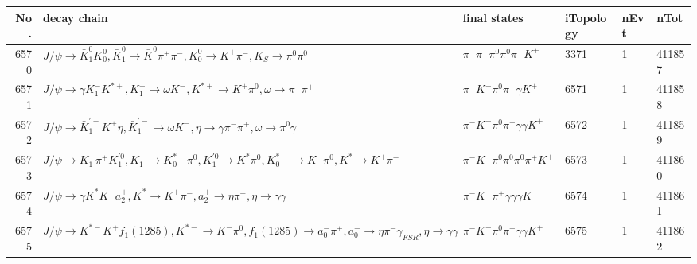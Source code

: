 \begin{table}[htbp] 
\begin{center}
\begin{small}
\begin{tabular}{rlllll}\hline\hline
 No. & decay chain & final states &  iTopology & nEvt & nTot \\\hline
6570&$J/\psi       \rightarrow \bar{K}_1^{0} K_0^{0}        , \bar{K}_1^{0}  \rightarrow \bar{K}^{0}   \pi^{+}        \pi^{-}        , K_0^{0}         \rightarrow K^{+}          \pi^{-}        , K_{S}           \rightarrow \pi^{0}        \pi^{0}        $&$\pi^{-}        \pi^{-}        \pi^{0}        \pi^{0}        \pi^{+}        K^{+}          $& 3371&    1&411857\\
6571&$J/\psi       \rightarrow \gamma       K_{1}^{-}      K^{*+}         , K_{1}^{-}       \rightarrow \omega         K^{-}          , K^{*+}          \rightarrow K^{+}          \pi^{0}        , \omega          \rightarrow \pi^{-}        \pi^{+}        $&$\pi^{-}        K^{-}          \pi^{0}        \pi^{+}        \gamma       K^{+}          $& 6571&    1&411858\\
6572&$J/\psi       \rightarrow \bar{K}_1^{'-}K^{+}          \eta          , \bar{K}_1^{'-} \rightarrow \omega         K^{-}          , \eta           \rightarrow \gamma       \pi^{-}        \pi^{+}        , \omega          \rightarrow \pi^{0}        \gamma       $&$\pi^{-}        K^{-}          \pi^{0}        \pi^{+}        \gamma       \gamma       K^{+}          $& 6572&    1&411859\\
6573&$J/\psi       \rightarrow K_{1}^{-}      \pi^{+}        K_1^{'0}      , K_{1}^{-}       \rightarrow K_{0}^{*-}     \pi^{0}        , K_1^{'0}       \rightarrow K^{*}          \pi^{0}        , K_{0}^{*-}      \rightarrow K^{-}          \pi^{0}        , K^{*}           \rightarrow K^{+}          \pi^{-}        $&$\pi^{-}        K^{-}          \pi^{0}        \pi^{0}        \pi^{0}        \pi^{+}        K^{+}          $& 6573&    1&411860\\
6574&$J/\psi       \rightarrow \gamma       K^{*}          K^{-}          a_{2}^{+}      , K^{*}           \rightarrow K^{+}          \pi^{-}        , a_{2}^{+}       \rightarrow \eta          \pi^{+}        , \eta           \rightarrow \gamma       \gamma       $&$\pi^{-}        K^{-}          \pi^{+}        \gamma       \gamma       \gamma       K^{+}          $& 6574&    1&411861\\
6575&$J/\psi       \rightarrow K^{*-}         K^{+}          f_{1}(1285)    , K^{*-}          \rightarrow K^{-}          \pi^{0}        , f_{1}(1285)     \rightarrow a_{0}^{-}      \pi^{+}        , a_{0}^{-}       \rightarrow \eta          \pi^{-}        \gamma_{FSR} , \eta           \rightarrow \gamma       \gamma       $&$\pi^{-}        K^{-}          \pi^{0}        \pi^{+}        \gamma       \gamma       K^{+}          $& 6575&    1&411862\\

\end{tabular}
\end{small}
\end{center}
\end{table}
